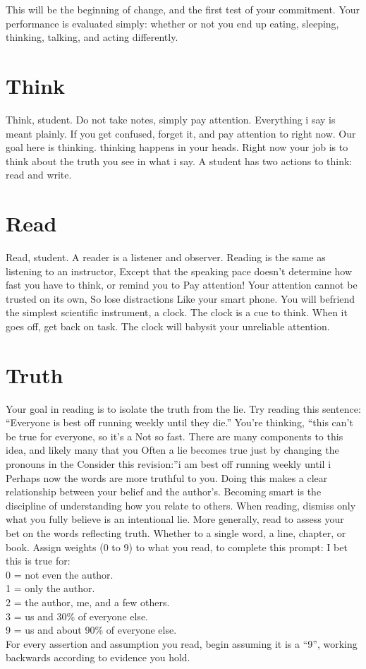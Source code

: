 \documentclass[
]{book}
\begin{document}
This will be the beginning of change, and the first test of your commitment.
Your performance is evaluated simply: whether or not you
end up eating, sleeping, thinking, talking, and acting differently.

\hypertarget{think}{%
\section{Think}\label{think}}

Think, student.
Do not take notes, simply pay attention.
Everything i say is meant plainly.
If you get confused, forget it, and pay attention to right now.
Our goal here is thinking. thinking happens in your heads.
Right now your job is to think about the truth you see in what i say.
A student has two actions to think: read and write.

\hypertarget{read}{%
\section{Read}\label{read}}

Read, student.
A reader is a listener and observer.
Reading is the same as listening to an instructor,
Except that the speaking pace doesn't determine how fast you have to think, or remind you to
Pay attention!
Your attention cannot be trusted on its own,
So lose distractions
Like your smart phone.
You will befriend the simplest scientific instrument, a clock.
The clock is a cue to think.
When it goes off, get back on task.
The clock will babysit your unreliable attention.

\hypertarget{truth}{%
\section{Truth}\label{truth}}

Your goal in reading is to isolate the truth from the lie.
Try reading this sentence:
``Everyone is best off running weekly until they die.''
You're thinking, ``this can't be true for everyone, so it's a
Not so fast.
There are many components to this idea, and likely many that you
Often a lie becomes true just by changing the pronouns in the
Consider this revision:''i am best off running weekly until i
Perhaps now the words are more truthful to you.
Doing this makes a clear relationship between your belief and the author's.
Becoming smart is the discipline of understanding how you relate to others.
When reading, dismiss only what you fully believe is an intentional lie.
More generally, read to assess your bet on the words reflecting truth.
Whether to a single word, a line, chapter, or book.
Assign weights (0 to 9) to what you read, to complete this prompt:
I bet this is true for:\\
0 = not even the author.\\
1 = only the author.\\
2 = the author, me, and a few others.\\
3 = us and 30\% of everyone else.\\
9 = us and about 90\% of everyone else.\\
For every assertion and assumption you read, begin assuming it is a ``9'', working backwards according to evidence you hold.
\end{document}
